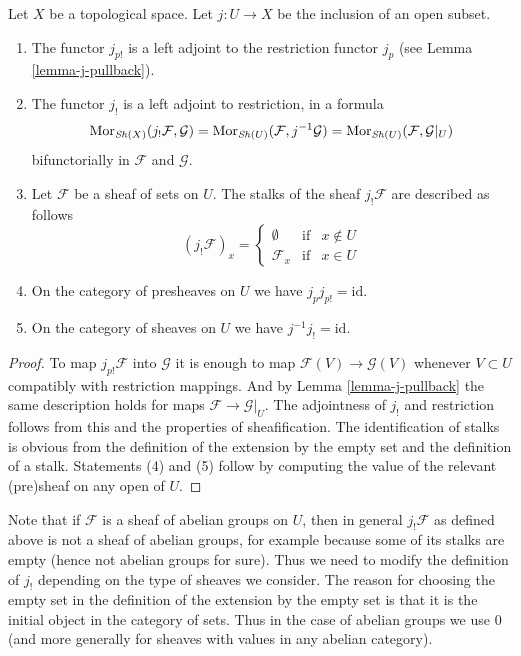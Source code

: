 \begin{lemma}
\label{lemma-j-shriek}
Let $X$ be a topological space.
Let $j : U \to X$ be the inclusion of an open subset.
\begin{enumerate}
\item The functor $j_{p!}$ is a left adjoint to the
restriction functor $j_p$ (see Lemma \ref{lemma-j-pullback}).
\item The functor $j_!$ is a left adjoint to restriction,
in a formula
$$
\mathop{\mathrm{Mor}}\nolimits_{\mathop{\mathit{Sh}}\nolimits(X)}(j_!\mathcal{F}, \mathcal{G})
=
\mathop{\mathrm{Mor}}\nolimits_{\mathop{\mathit{Sh}}\nolimits(U)}(\mathcal{F}, j^{-1}\mathcal{G})
=
\mathop{\mathrm{Mor}}\nolimits_{\mathop{\mathit{Sh}}\nolimits(U)}(\mathcal{F}, \mathcal{G}|_U)
$$
bifunctorially in $\mathcal{F}$ and $\mathcal{G}$.
\item Let $\mathcal{F}$ be a sheaf of sets on $U$.
The stalks of the sheaf $j_!\mathcal{F}$ are described
as follows
$$
(j_{!}\mathcal{F})_x =
\left\{
\begin{matrix}
\emptyset & \text{if} & x \not \in U \\
\mathcal{F}_x & \text{if} & x \in U
\end{matrix}
\right.
$$
\item On the category of presheaves on $U$ we have $j_pj_{p!} = \text{id}$.
\item On the category of sheaves on $U$ we have $j^{-1}j_! = \text{id}$.
\end{enumerate}
\end{lemma}

\begin{proof}
To map $j_{p!}\mathcal{F}$ into $\mathcal{G}$
it is enough to map $\mathcal{F}(V) \to \mathcal{G}(V)$
whenever $V \subset U$ compatibly with restriction
mappings. And by Lemma \ref{lemma-j-pullback}
the same description holds for maps
$\mathcal{F} \to \mathcal{G}|_U$.
The adjointness of $j_!$ and restriction follows
from this and the properties of sheafification.
The identification of stalks is obvious from the
definition of the extension by the empty set
and the definition of a stalk.
Statements (4) and (5) follow by computing the
value of the relevant (pre)sheaf on any open of $U$.
\end{proof}

\noindent
Note that if $\mathcal{F}$ is a sheaf
of abelian groups on $U$, then in general $j_!\mathcal{F}$ as
defined above is not a sheaf of abelian groups, for example
because some of its stalks are empty (hence not abelian groups
for sure). Thus we need to modify the definition of
$j_!$ depending on the type of sheaves we consider.
The reason for choosing the empty set in the definition of the
extension by the empty set is that it is the initial object
in the category of sets. Thus in the case of abelian groups
we use $0$ (and more generally for sheaves with values in
any abelian category).

